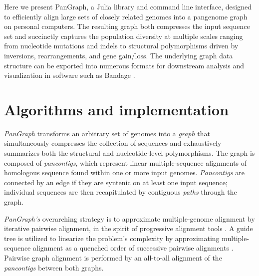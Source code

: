 \documentclass[aps,rmp,reprint,superscriptaddress,notitlepage,10pt]{revtex4-1}
\begin{document}
Here we present PanGraph, a Julia \cite{bezanson2017julia} library and command line interface, designed to efficiently align large sets of closely related genomes into a pangenome graph on personal computers.
The resulting graph both compresses the input sequence set and succinctly captures the population diversity at multiple scales ranging from nucleotide mutations and indels to structural polymorphisms driven by inversions, rearrangements, and gene gain/loss.
The underlying graph data structure can be exported into numerous formats for downstream analysis and visualization in software such as Bandage \cite{wick2015bandage}.

\section{Algorithms and implementation}
\emph{PanGraph} transforms an arbitrary set of genomes into a \emph{graph} that simultaneously compresses the collection of sequences and exhaustively summarizes both the structural and nucleotide-level polymorphisms.
The graph is composed of \emph{pancontigs}, which represent linear multiple-sequence alignments of homologous sequence found within one or more input genomes.
\emph{Pancontigs} are connected by an edge if they are syntenic on at least one input sequence; individual sequences are then recapitulated by contiguous \emph{paths} through the graph.

\emph{PanGraph's} overarching strategy is to approximate multiple-genome alignment by iterative pairwise alignment, in the spirit of progressive alignment tools \cite{darling2010progressivemauve,armstrong2020progressive}.
A guide tree is utilized to linearize the problem's complexity by approximating multiple-sequence alignment as a quenched order of successive pairwise alignments \cite{feng1987progressive}.
Pairwise graph alignment is performed by an all-to-all alignment of the \emph{pancontigs} between both graphs.
\end{document}
